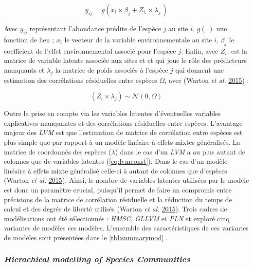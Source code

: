 \documentclass[12pt,]{article}
\begin{document}
\begin{equation} y_{ij} = g\left(x_{i} \times \beta_j + Z_{i.} \times \lambda_{j.}\right) \label{eq:lvm}\end{equation}

Avec \(y_{ij}\) représentant l'abondance prédite de l'espèce \(j\) au
site \(i\). \(g(.)\) une fonction de lien ; \(x_i\) le vecteur de la
variable environnementale au site \(i\), \(\beta_j\) le coefficient de
l'effet environnemental associé pour l'espèce \(j\). Enfin, avec
\(Z_i.\) est la matrice de variable latente associée aux sites et et qui
joue le rôle des prédicteurs manquants et \(\lambda_j\) la matrice de
poids associés à l'espèce \(j\) qui donnent une estimation des
corrélations résiduelles entre espèces \(\Omega\), avec (Warton \emph{et
al.} \protect\hyperlink{ref-warton2015}{2015}) :

\begin{equation}\left(Z_i \times \lambda_j\right) \sim \mathcal{N}\left(0, \Omega\right)\label{eq:lvmconst}\end{equation}

Outre la prise en compte via les variables latentes d'éventuelles
variables explicatives manquantes et des corrélations résiduelles entre
espèces. L'avantage majeur des \emph{LVM} est que l'estimation de
matrice de corrélation entre espèces est plus simple que par rapport à
un modèle linéaire à effets mixtes généralisés. La matrice de coordonnés
des espèces (\(\lambda\)) dans le cas d'un \emph{LVM} a au plus autant
de colonnes que de variables latentes (\cref{eq:lvmconst}). Dans le cas
d'un modèle linéaire à effets mixte généralisé celle-ci à autant de
colonnes que d'espèces (Warton \emph{et al.}
\protect\hyperlink{ref-warton2015}{2015}). Ainsi, le nombre de variables
latentes utilisées par le modèle est donc un paramètre crucial,
puisqu'il permet de faire un compromis entre précisions de la matrice de
corrélation résiduelle et la réduction du temps de calcul et des degrés
de liberté utilisés (Warton \emph{et al.}
\protect\hyperlink{ref-warton2015}{2015}). Trois cadres de modélisations
ont été sélectionnés : \emph{HMSC}, \emph{GLLVM} et \emph{PLN} et
exploré cinq variantes de modèles ces modèles. L'ensemble des
caractéristiques de ces variantes de modèles sont présentées dans le
\cref{tbl:summarymod} .

\hypertarget{hierachical-modelling-of-species-communities}{%
\subsubsection{\texorpdfstring{\emph{Hierachical modelling of Species
Communities}}{Hierachical modelling of Species Communities}}\label{hierachical-modelling-of-species-communities}}
\end{document}
